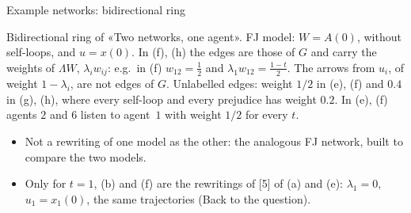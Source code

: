 \documentclass[10pt, aspectratio=169]{beamer}
\begin{document}
\begin{frame}[label=m-fj-graphs-ring]{Example networks: bidirectional ring}
\hfill

  \smallskip
  {\scriptsize Bidirectional ring of «Two networks, one agent». FJ model: $W = A(0)$, without self-loops,
  and $u = x(0)$. In (f), (h) the edges are those of $G$ and carry the weights of
  $\Lambda W$, $\lambda_i w_{ij}$: e.g.\ in (f) $w_{12} = \frac12$ and
  $\lambda_1 w_{12} = \frac{1-t}{2}$. The arrows from $u_i$, of weight $1 - \lambda_i$, are
  not edges of $G$. Unlabelled edges: weight $1/2$ in (e), (f) and $0.4$ in (g), (h), where
  every self-loop and every prejudice has weight $0.2$. In (e), (f) agents $2$ and $6$
  listen to agent~$1$ with weight $1/2$ for every $t$.\par}

  \smallskip
  \footnotesize
  \begin{itemize}
    \item Not a rewriting of one model as the other: the analogous FJ network, built to
          compare the two models.
    \item Only for $t = 1$, (b) and (f) are the rewritings of [5] of (a) and (e): $\lambda_1 = 0$,
          $u_1 = x_1(0)$, the same trajectories (Back to the question).
  \end{itemize}
\end{frame}
\end{document}
